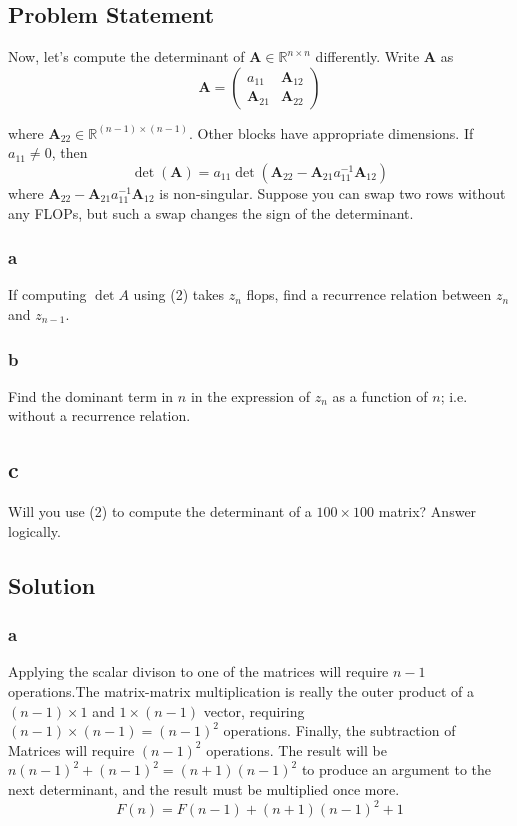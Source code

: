 \documentclass[11pt]{report}
\theoremstyle{definition}
\newcommand{\mat}[1]{\mathbf{#1}}
\begin{document}
\subsection*{Problem Statement}
Now, let's compute the determinant of $\mat{A}\in\mathbb{R}^{n\times n}$ differently.
Write $\mat{A}$ as
\begin{equation}
	\mat{A} = \begin{pmatrix}
		a_{11}       & \mat{A}_{12} \\
		\mat{A}_{21} & \mat{A}_{22}
	\end{pmatrix}
\end{equation}

where $\mat{A}_{22}\in\mathbb{R}^{(n-1)\times(n-1)}$. Other blocks have
appropriate dimensions.  If $a_{11}\neq 0$, then
\[ \det(\mat{A})=a_{11}\det(\mat{A}_{22}-\mat{A}_{21}a_{11}^{-1}\mat{A}_{12}) \]
where $\mat{A}_{22}-\mat{A}_{21}a_{11}^{-1}\mat{A}_{12}$ is non-singular.
Suppose you can swap two rows without any FLOPs, but such a swap changes the
sign of the determinant.

\subsubsection*{a}
If computing $\det{A}$ using (2) takes $z_n$ flops, find a recurrence relation
between $z_n$ and $z_{n-1}$.

\subsubsection*{b}
Find the dominant term in $n$ in the expression of $z_n$ as a function of $n$;
i.e. without a recurrence relation.

\subsection*{c}
Will you use (2) to compute the determinant of a $100\times 100$ matrix? Answer
logically.


\subsection*{Solution}
\subsubsection*{a}
Applying the scalar divison to one of the matrices will require $n-1$
operations.The matrix-matrix multiplication is really the outer product of a
$(n-1)\times 1$ and $1\times(n-1)$ vector, requiring $(n-1)\times(n-1)=(n-1)^2$
operations. Finally, the subtraction of Matrices will require $(n-1)^2$ operations.
The result will be $n(n-1)^2+(n-1)^2=(n+1)(n-1)^2$ to produce an argument to the
next determinant, and the result must be multiplied once more.
\[ F(n) = F(n-1) + (n+1)(n-1)^2 + 1 \]
\end{document}
